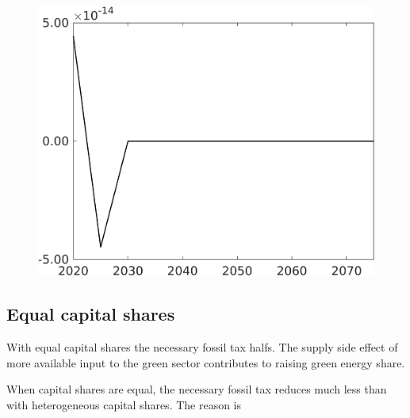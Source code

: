 \documentclass[12pt]{article}
\begin{document}
\begin{figure}[h!!]
\begin{minipage}[]{0.32\textwidth}
	\end{minipage}	
	\begin{minipage}[]{0.32\textwidth}
		\includegraphics[width=1\textwidth]{../../codding_model/own_basedOnFried/optimalPol_010922_revision/figures/all_13Sept22/CompTaufPER_bytaul_Reg0_F_spillover0_nsk0_xgr0_knspil1_sep1_LFlimit1_emsbase0_countec0_GovRev0_etaa0.79_lgd0.png}
	\end{minipage}	
\end{figure}
\clearpage 
\newpage
\subsection{Equal capital shares}
With equal capital shares the necessary fossil tax halfs. The supply side effect of more available input to the green sector contributes to raising green energy share.

When capital shares are equal, the necessary fossil tax reduces much less than with heterogeneous capital shares. The reason is
\end{document}
